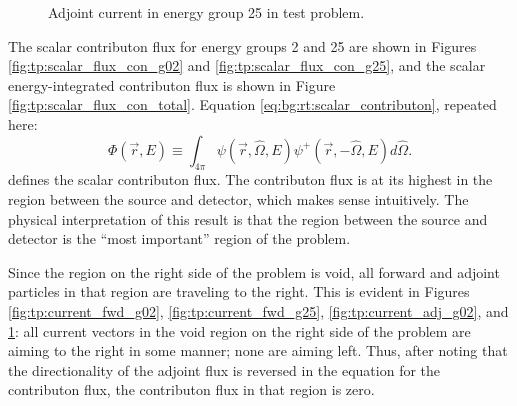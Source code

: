 \begin{figure}
\begin{minipage}{0.45\linewidth}
    \caption{Adjoint current in energy group 25 in test problem.}
    \label{fig:tp:current_adj_g25}
  \end{minipage}
\end{figure}

The scalar contributon flux for energy groups 2 and 25 are shown in Figures \ref{fig:tp:scalar_flux_con_g02} and \ref{fig:tp:scalar_flux_con_g25}, and the scalar energy-integrated contributon flux is shown in Figure \ref{fig:tp:scalar_flux_con_total}.
Equation \ref{eq:bg:rt:scalar_contributon}, repeated here:
\begin{equation*}
  \Phi\left(\vec{r},E\right) \equiv
  \int_{4\pi}\psi\left(\vec{r},\hat{\Omega},E\right)\psi^+\left(\vec{r},-\hat{\Omega},E\right)d\hat{\Omega}.
\end{equation*}
defines the scalar contributon flux.
The contributon flux is at its highest in the region between the source and detector, which makes sense intuitively.
The physical interpretation of this result is that the region between the source and detector is the ``most important'' region of the problem.

Since the region on the right side of the problem is void, all forward and adjoint particles in that region are traveling to the right.
This is evident in Figures \ref{fig:tp:current_fwd_g02}, \ref{fig:tp:current_fwd_g25}, \ref{fig:tp:current_adj_g02}, and \ref{fig:tp:current_adj_g25}: all current vectors in the void region on the right side of the problem are aiming to the right in some manner; none are aiming left.
Thus, after noting that the directionality of the adjoint flux is reversed in the equation for the contributon flux, the contributon flux in that region is zero.

